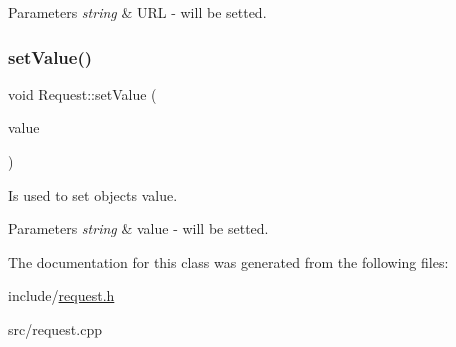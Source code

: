 \begin{DoxyParams}{Parameters}
{\em string} & U\+RL -\/ will be setted. \\
\hline
\end{DoxyParams}
\mbox{\label{classRequest_a2f8dbfdcbf1d9f07e8d1aa7216b044e3}} 
\subsubsection{\texorpdfstring{set\+Value()}{setValue()}}
{\footnotesize\ttfamily void Request\+::set\+Value (\begin{DoxyParamCaption}\item[{string}]{value }\end{DoxyParamCaption})}



Is used to set object\textquotesingle{}s value. 


\begin{DoxyParams}{Parameters}
{\em string} & value -\/ will be setted. \\
\hline
\end{DoxyParams}


The documentation for this class was generated from the following files\+:\begin{DoxyCompactItemize}
\item 
include/\hyperlink{request_8h}{request.\+h}\item 
src/request.\+cpp\end{DoxyCompactItemize}
